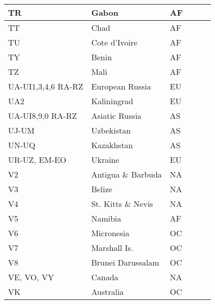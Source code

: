 \documentclass[a4paper]{article}
\begin{document}
\begin{longtable}{|p{1.5cm}|p{4cm}|l|p{2cm}|p{2cm}|p{2cm}|}
\hline
TR                     & Gabon                                      & AF    & & & \\
\hline
TT                     & Chad                                       & AF    & & & \\
\hline
TU                     & Cote d'Ivoire                              & AF    & & & \\
\hline
TY                     & Benin                                      & AF    & & & \\
\hline
TZ                     & Mali                                       & AF    & & & \\
\hline
UA-UI1,3,4,6 RA-RZ     & European Russia                            & EU    & & & \\
\hline
UA2                    & Kaliningrad                                & EU    & & & \\
\hline
UA-UI8,9,0 RA-RZ       & Asiatic Russia                             & AS    & & & \\
\hline
UJ-UM                  & Uzbekistan                                 & AS    & & & \\
\hline
UN-UQ                  & Kazakhstan                                 & AS    & & & \\
\hline
UR-UZ, EM-EO           & Ukraine                                    & EU    & & & \\
\hline
V2                     & Antigua \& Barbuda                         & NA    & & & \\
\hline
V3                     & Belize                                     & NA    & & & \\
\hline
V4                     & St. Kitts \& Nevis                         & NA    & & & \\
\hline
V5                     & Namibia                                    & AF    & & & \\
\hline
V6                     & Micronesia                                 & OC    & & & \\
\hline
V7                     & Marshall Is.                               & OC    & & & \\
\hline
V8                     & Brunei Darussalam                          & OC    & & & \\
\hline
VE, VO, VY             & Canada                                     & NA    & & & \\
\hline
VK                     & Australia                                  & OC    & & & \\

\end{longtable}
\end{document}
